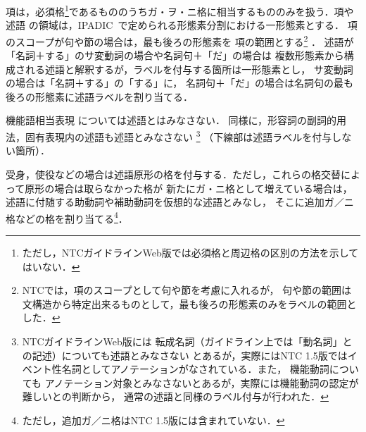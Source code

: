 \documentclass[japanese]{jnlp_1.4}
\begin{document}
項は，必須格\footnote{ただし，NTCガイドラインWeb版では必須格と周辺格の区別の方法を示してはいない．}であるもののうちガ・ヲ・ニ格に相当するもののみを扱う．項や述語
の領域は，IPADIC~\cite{ipadic}で定められる形態素分割における一形態素とする．
項のスコープが句や節の場合は，最も後ろの形態素を
項の範囲とする\footnote{NTCでは，項のスコープとして句や節を考慮に入れるが，
句や節の範囲は文構造から特定出来るものとして，最も後ろの形態素のみをラベルの範囲とした．}
．
述語が「名詞＋する」のサ変動詞の場合や名詞句＋「だ」の場合は
複数形態素から構成される述語と解釈するが，ラベルを付与する箇所は一形態素とし，
サ変動詞の場合は「名詞＋する」の「する」に，
名詞句＋「だ」の場合は名詞句の最も後ろの形態素に述語ラベルを割り当てる．


機能語相当表現
については述語とはみなさない．
同様に，形容詞の副詞的用法，固有表現内の述語も述語とみなさない
\footnote{NTCガイドラインWeb版には
転成名詞（ガイドライン上では「動名詞」との記述）についても述語とみなさない
とあるが，実際にはNTC 1.5版ではイベント性名詞としてアノテーションがなされている．また，
機能動詞についても
アノテーション対象とみなさないとあるが，実際には機能動詞の認定が難しいとの判断から，
通常の述語と同様のラベル付与が行われた．}
（下線部は述語ラベルを付与しない箇所）．

受身，使役などの場合は述語原形の格を付与する．ただし，これらの格交替によって原形の場合は取らなかった格が
新たにガ・ニ格として増えている場合は，述語に付随する助動詞や補助動詞を仮想的な述語とみなし，
そこに追加ガ／ニ格などの格を割り当てる\footnote{ただし，追加ガ／ニ格はNTC 1.5版には含まれていない．}．
\end{document}
